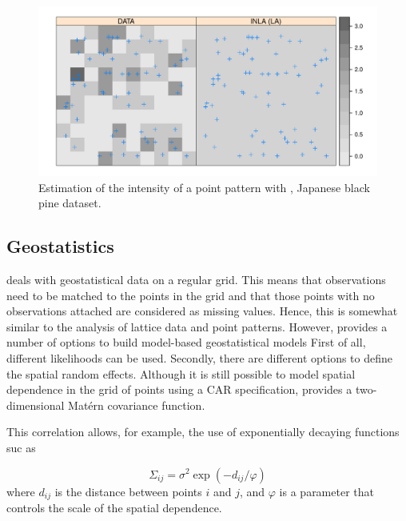 \documentclass[article]{jss}
\begin{document}
\begin{figure}[h]
\begin{center}
\includegraphics{spatial_inla-008}
\end{center}
\caption{Estimation of the intensity of a point pattern with , 
Japanese black pine dataset.}
\label{fig:sppa}
\end{figure}



\subsection{Geostatistics}


 deals with geostatistical data on a regular grid. This means
that observations need to be matched to the points in the grid and that those
points with no observations attached are considered as missing values.
Hence, this is somewhat similar to the analysis of lattice data and point
patterns. However,  provides a number of options to build 
model-based geostatistical models \citet{DiggleRibeiro:2007} First
of all, different likelihoods can be used. Secondly, there are different
options to define the spatial random effects. Although it is still possible
to model spatial dependence in the grid of points using a CAR specification,
 provides a two-dimensional Mat\'ern covariance function. 


This correlation allows, for example, the use of exponentially decaying
functions suc as 

$$
\Sigma_{ij} = \sigma^2 \exp(-d_{ij}/\varphi)
$$
\noindent
where $d_{ij}$ is the distance between points $i$ and $j$, and $\varphi$
is a parameter that controls the scale of the spatial dependence.


%
%
%
\end{document}
